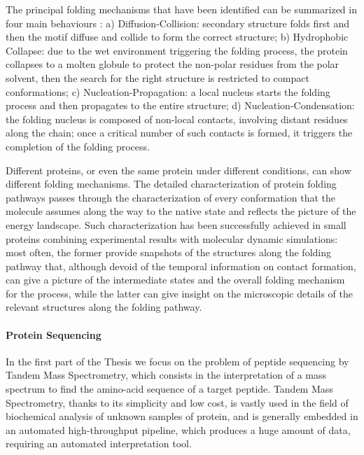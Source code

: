 The principal folding  mechanisms that have been identified can be summarized  in
four main behaviours \cite{Nickson2010}: a) Diffusion-Collision: secondary structure folds first and then
the motif diffuse and collide to form the correct structure; b) Hydrophobic Collapse:  
due to the wet environment triggering the folding
process, the protein collapses to a molten globule to protect the non-polar residues from the polar solvent, then the search for the right structure is restricted to compact conformations; c) Nucleation-Propagation: a local nucleus starts the folding process and then propagates to
the entire structure; d) Nucleation-Condensation: the folding nucleus is composed of non-local contacts, involving distant residues along the chain; once a critical number of such contacts is formed, it triggers  the completion of the folding
process. %

Different proteins, or even the same protein under different conditions, can show different folding mechanisms.
The detailed characterization of protein folding pathways passes through the
characterization of every conformation that the molecule assumes along the way to the
native state\cite{Daggett2002} and  reflects the picture of the energy landscape. Such characterization  has been successfully achieved  in small proteins combining experimental results with molecular dynamic
simulations: most often, the former 
provide snapshots of the
structures along the folding pathway that, although devoid of %
the temporal information on contact formation, can give a picture of the intermediate states
and the overall folding mechanism for the process, while the latter can give insight on the microscopic details of the relevant structures along the folding pathway. 



\paragraph{Protein Sequencing}
In the first part of the Thesis we focus on the problem of peptide
sequencing by Tandem  Mass Spectrometry, which consists in  the interpretation of a mass
spectrum to find the amino-acid sequence  of a target peptide.
Tandem Mass Spectrometry, thanks to its simplicity and low cost, is vastly used in the field of biochemical analysis of unknown
samples of protein, and is 
generally embedded in an automated high-throughput pipeline, which produces a huge
amount of data,  requiring an automated interpretation tool.

